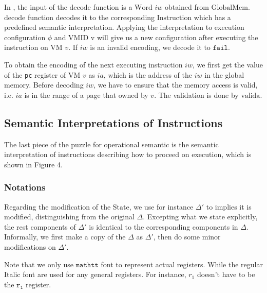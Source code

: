 \documentclass[a4paper]{article}
\newcommand*{\STATE}{\text{State}}
\newcommand*{\MEM}{\text{GlobalMem}}
\newcommand*{\WORD}{\text{Word}}
\newcommand*{\VMID}{\text{VMID}}
\newcommand*{\INSTR}{\text{Instruction}}
\newcommand*{\decode}{\text{decode}}
\newcommand*{\valida}{\text{valida}}
\newcommand{\refr}[1]{\hyperlink{#1}{\TirName {#1}}}
\begin{document}
In \refr{ExecInstr}, the input of the $\decode$ function is a $\WORD$ $iw$
obtained from $\MEM$. $\decode$ function decodes it to the corresponding
$\INSTR$ which has a predefined semantic interpretation. Applying the
interpretation to execution configuration $\phi$ and $\VMID$ v will give us a
new configuration after executing the instruction on VM $v$. If $iw$ is an
invalid encoding, we decode it to $\mathtt{fail}$.

To obtain the encoding of the next executing instruction $iw$, we first get the
value of the \texttt{pc} register of VM $v$ as $ia$, which is the address of the
$iw$ in the global memory. Before decoding $iw$, we have to ensure that the
memory access is valid, i.e. $ia$ is in the range of a page that owned by $v$.
The validation is done by $\valida$.


\subsection{Semantic Interpretations of Instructions}

The last piece of the puzzle for operational semantic is the semantic
interpretation of instructions describing how to proceed on execution, which is shown
in Figure 4.
\subsubsection{Notations}
Regarding the modification of the $\STATE$, we use for instance $\Delta'$ to
implies it is modified, distinguishing from the original $\Delta$. Excepting
what we state explicitly, the rest components of $\Delta'$ is
identical to the corresponding components in $\Delta$. Informally, we first
make a copy of the $\Delta$ as $\Delta'$, then do some minor modifications on
$\Delta'$.

Note that we only use $\mathtt{mathtt}$ font to represent actual registers.
While the regular Italic font are used for any general registers. For instance,
$r_{1}$ doesn't have to be the $\mathtt{r_{1}}$ register.
\end{document}
